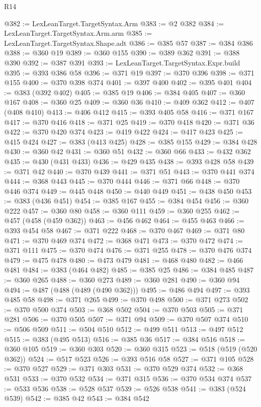 \begin{lexlean}{R14}
\begin{coremodule}
@382 := LexLeanTarget.TargetSyntax.Arm
@383 := @2 @382
@384 := LexLeanTarget.TargetSyntax.Arm.arm
@385 := LexLeanTarget.TargetSyntax.Shape.adt
@386 := @385 @57
@387 := @384 @386
@388 := @360 @19
@389 := @360 @155
@390 := @389 @362
@391 := @388 @390
@392 := @387 @391
@393 := LexLeanTarget.TargetSyntax.Expr.build
@395 := @393 @386 @58
@396 := @371 @19
@397 := @370 @396
@398 := @371 @155
@400 := @370 @398 @374
@401 := @397 @400
@402 := @395 @401
@404 := @383 (@392 @402)
@405 := @385 @19
@406 := @384 @405
@407 := @360 @167
@408 := @360 @25
@409 := @360 @36
@410 := @409 @362
@412 := @407 (@408 @410)
@413 := @406 @412
@415 := @393 @405 @58
@416 := @371 @167
@417 := @370 @416
@418 := @371 @25
@419 := @370 @418
@420 := @371 @36
@422 := @370 @420 @374
@423 := @419 @422
@424 := @417 @423
@425 := @415 @424
@427 := @383 (@413 @425)
@428 := @385 @155
@429 := @384 @428
@430 := @360 @42
@431 := @360 @51
@432 := @360 @66
@433 := @432 @362
@435 := @430 (@431 @433)
@436 := @429 @435
@438 := @393 @428 @58
@439 := @371 @42
@440 := @370 @439
@441 := @371 @51
@443 := @370 @441 @374
@444 := @368 @443
@445 := @370 @444
@446 := @371 @66
@448 := @370 @446 @374
@449 := @445 @448
@450 := @440 @449
@451 := @438 @450
@453 := @383 (@436 @451)
@454 := @385 @167
@455 := @384 @454
@456 := @360 @222
@457 := @360 @80
@458 := @360 @111
@459 := @360 @255
@462 := @457 (@458 (@459 @362))
@463 := @456 @462
@464 := @455 @463
@466 := @393 @454 @58
@467 := @371 @222
@468 := @370 @467
@469 := @371 @80
@471 := @370 @469 @374
@472 := @368 @471
@473 := @370 @472
@474 := @371 @111
@475 := @370 @474
@476 := @371 @255
@478 := @370 @476 @374
@479 := @475 @478
@480 := @473 @479
@481 := @468 @480
@482 := @466 @481
@484 := @383 (@464 @482)
@485 := @385 @25
@486 := @384 @485
@487 := @360 @265
@488 := @360 @273
@489 := @360 @281
@490 := @360 @94
@494 := @487 (@488 (@489 (@490 @362)))
@495 := @486 @494
@497 := @393 @485 @58
@498 := @371 @265
@499 := @370 @498
@500 := @371 @273
@502 := @370 @500 @374
@503 := @368 @502
@504 := @370 @503
@505 := @371 @281
@506 := @370 @505
@507 := @371 @94
@509 := @370 @507 @374
@510 := @506 @509
@511 := @504 @510
@512 := @499 @511
@513 := @497 @512
@515 := @383 (@495 @513)
@516 := @385 @36
@517 := @384 @516
@518 := @360 @105
@519 := @360 @303
@520 := @360 @315
@523 := @518 (@519 (@520 @362))
@524 := @517 @523
@526 := @393 @516 @58
@527 := @371 @105
@528 := @370 @527
@529 := @371 @303
@531 := @370 @529 @374
@532 := @368 @531
@533 := @370 @532
@534 := @371 @315
@536 := @370 @534 @374
@537 := @533 @536
@538 := @528 @537
@539 := @526 @538
@541 := @383 (@524 @539)
@542 := @385 @42
@543 := @384 @542

\end{coremodule}
\end{lexlean}
